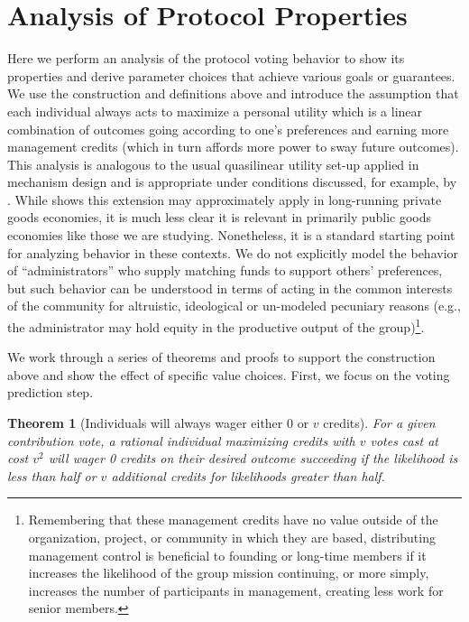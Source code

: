 \documentclass{article}
\newtheorem{theorem}{Theorem}[section]
\begin{document}
\section{Analysis of Protocol Properties}
Here we perform an analysis of the protocol voting behavior to show its properties and derive parameter choices that achieve various goals or guarantees. We use the construction and definitions above and introduce the assumption that each individual always acts to maximize a personal utility which is a linear combination of outcomes going according to one's preferences and earning more management credits (which in turn affords more power to sway future outcomes). This analysis is analogous to the usual quasilinear utility set-up applied in mechanism design and is appropriate under conditions discussed, for example, by \cite{buterin2019flexible}. While \cite{gorokh2021from} shows this extension may approximately apply in long-running private goods economies, it is much less clear it is relevant in primarily public goods economies like those we are studying. Nonetheless, it is a standard starting point for analyzing behavior in these contexts. We do not explicitly model the behavior of ``administrators'' who supply matching funds to support others' preferences, but such behavior can be understood in terms of acting in the common interests of the community for altruistic, ideological or un-modeled pecuniary reasons (e.g., the administrator may hold equity in the productive output of the group)\footnote{Remembering that these management credits have no value outside of the organization, project, or community in which they are based, distributing management control is beneficial to founding or long-time members if it increases the likelihood of the group mission continuing, or more simply, increases the number of participants in management, creating less work for senior members.}.

We work through a series of theorems and proofs to support the construction above and show the effect of specific value choices. First, we focus on the voting prediction step.

\begin{theorem}[Individuals will always wager either 0 or $v$ credits]
For a given contribution vote, a rational individual maximizing credits with $v$ votes cast at cost $v^2$ will wager 0 credits on their desired outcome succeeding if the likelihood is less than half or $v$ additional credits for likelihoods greater than half.
\end{theorem}
\end{document}
